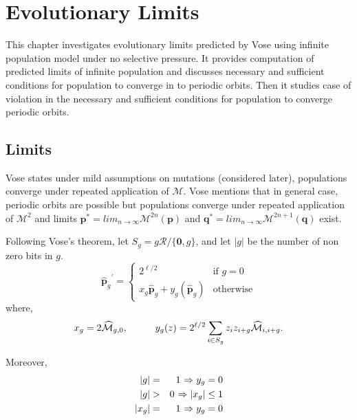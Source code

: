 \chapter{Evolutionary Limits} \label{ch:evolutionary limits}
This chapter investigates evolutionary limits predicted by Vose using infinite population model under no selective pressure. 
It provides computation of predicted limits of infinite population and discusses necessary and sufficient conditions for 
population to converge in to periodic orbits. Then it studies case of violation in the necessary and sufficient conditions 
for population to converge periodic orbits.

\section{Limits}
\label{Limits}
Vose states under mild assumptions on mutations (considered later), populations converge under repeated application 
of $\mathcal{M}$. Vose mentions that in general case, periodic orbits are possible but populations converge under 
repeated application of $\mathcal{M}^2$ and limits ${\bm p}^\ast = lim_{n \rightarrow \infty} \mathcal{M}^{2n}({\bm p})$ 
and ${\bm q}^\ast = lim_{n \rightarrow \infty} \mathcal{M}^{2n+1}({\bm q})$ exist.

Following Vose's theorem, let $S_g = g \mathcal{R} / \{\textbf{0}, g\}$, and let $|g|$ be the number of non zero bits in $g$.
\[
{{\widehat{{\bm p}}}_g}^{\prime}  = \begin{cases}
    2^{\ell /2}  & \text{if $g = 0$}\\
    x_g \widehat{{\bm p}}_g + y_g(\widehat{{\bm p}}_g) & \text{otherwise}
  \end{cases}
\]
where,
\[
x_g = 2\widehat{\mathcal{M}}_{g,0},  \hspace*{1cm} y_g(z) = 2^{\ell /2} \sum_{i \in S_g} z_i z_{i+g} \widehat{\mathcal{M}}_{i,i+g}.
\]

Moreover, 
\begin{eqnarray*}
|g| & = & 1 \hspace{0.01in} \Rightarrow y_g = 0 \\
|g| & > & 0 \hspace{0.01in} \Rightarrow |x_g| \leq 1 \\
|x_g| & = & 1 \hspace{0.01in} \Rightarrow y_g = 0
\end{eqnarray*}

